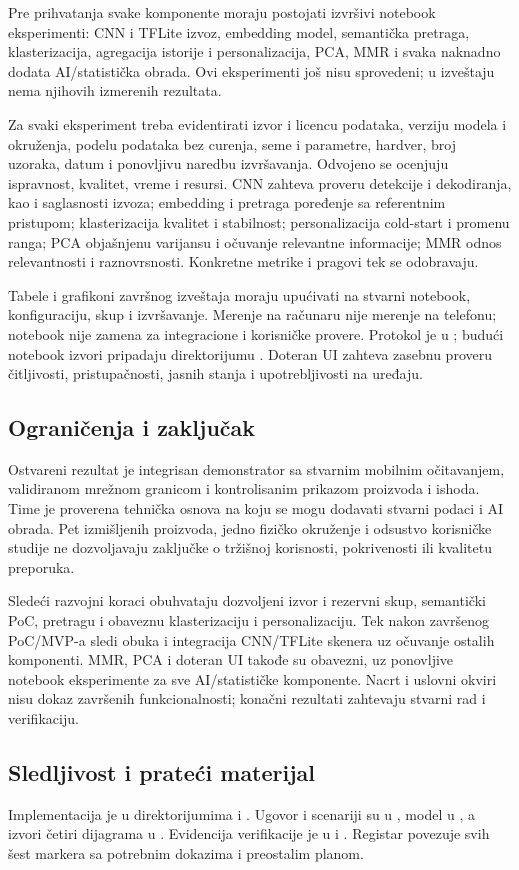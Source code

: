 \documentclass[12pt,a4paper]{article}
\begin{document}
Pre prihvatanja svake komponente moraju postojati izvršivi notebook eksperimenti: CNN i TFLite izvoz, embedding model, semantička pretraga, klasterizacija, agregacija istorije i personalizacija, PCA, MMR i svaka naknadno dodata AI/statistička obrada. Ovi eksperimenti još nisu sprovedeni; u izveštaju nema njihovih izmerenih rezultata.

Za svaki eksperiment treba evidentirati izvor i licencu podataka, verziju modela i okruženja, podelu podataka bez curenja, seme i parametre, hardver, broj uzoraka, datum i ponovljivu naredbu izvršavanja. Odvojeno se ocenjuju ispravnost, kvalitet, vreme i resursi. CNN zahteva proveru detekcije i dekodiranja, kao i saglasnosti izvoza; embedding i pretraga poređenje sa referentnim pristupom; klasterizacija kvalitet i stabilnost; personalizacija cold-start i promenu ranga; PCA objašnjenu varijansu i očuvanje relevantne informacije; MMR odnos relevantnosti i raznovrsnosti. Konkretne metrike i pragovi tek se odobravaju.

Tabele i grafikoni završnog izveštaja moraju upućivati na stvarni notebook, konfiguraciju, skup i izvršavanje. Merenje na računaru nije merenje na telefonu; notebook nije zamena za integracione i korisničke provere. Protokol je u ; budući notebook izvori pripadaju direktorijumu . Doteran UI zahteva zasebnu proveru čitljivosti, pristupačnosti, jasnih stanja i upotrebljivosti na uređaju.

\subsection{Ograničenja i zaključak}

Ostvareni rezultat je integrisan demonstrator sa stvarnim mobilnim očitavanjem, validiranom mrežnom granicom i kontrolisanim prikazom proizvoda i ishoda. Time je proverena tehnička osnova na koju se mogu dodavati stvarni podaci i AI obrada. Pet izmišljenih proizvoda, jedno fizičko okruženje i odsustvo korisničke studije ne dozvoljavaju zaključke o tržišnoj korisnosti, pokrivenosti ili kvalitetu preporuka.

Sledeći razvojni koraci obuhvataju dozvoljeni izvor i rezervni skup, semantički PoC, pretragu i obaveznu klasterizaciju i personalizaciju. Tek nakon završenog PoC/MVP-a sledi obuka i integracija CNN/TFLite skenera uz očuvanje ostalih komponenti. MMR, PCA i doteran UI takođe su obavezni, uz ponovljive notebook eksperimente za sve AI/statističke komponente. Nacrt i uslovni okviri nisu dokaz završenih funkcionalnosti; konačni rezultati zahtevaju stvarni rad i verifikaciju.

\subsection{Sledljivost i prateći materijal}

Implementacija je u direktorijumima  i .
Ugovor i scenariji su u , model u
, a izvori četiri dijagrama u .
Evidencija verifikacije je u  i
. Registar 
povezuje svih šest markera sa potrebnim dokazima i preostalim planom.
\end{document}
